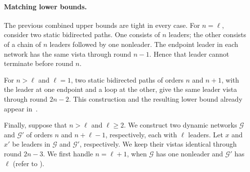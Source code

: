 \documentclass[11pt]{article}
\begin{document}
\paragraph{Matching lower bounds.}
The previous combined upper bounds are tight in every case.
For \(n=\ell\), consider two static bidirected paths.  One
consists of \(n\) leaders; the other consists of a chain of \(n\) leaders
followed by one nonleader.  The endpoint leader in each network has the same
vista through round \(n-1\). Hence that leader cannot terminate before round \(n\).

For \(n>\ell\) and \(\ell=1\), two static bidirected paths of
orders \(n\) and \(n+1\), with the leader at one endpoint and a loop at the
other, give the same leader vista through round \(2n-2\).  This construction
and the resulting lower bound already appear in~\cite{DLV26}.

Finally, suppose that \(n>\ell\) and \(\ell\geq2\).
We construct two dynamic networks \(\mathcal G\) and \(\mathcal G'\)
of orders \(n\) and \(n+\ell-1\), respectively, each with \(\ell\) leaders.
Let \(x\) and \(x'\) be leaders in \(\mathcal G\) and \(\mathcal G'\),
respectively. We keep their vistas identical through round \(2n-3\).
We first handle \(n=\ell+1\), when \(\mathcal G\) has one nonleader
and \(\mathcal G'\) has \(\ell\) (refer to ).
\end{document}
